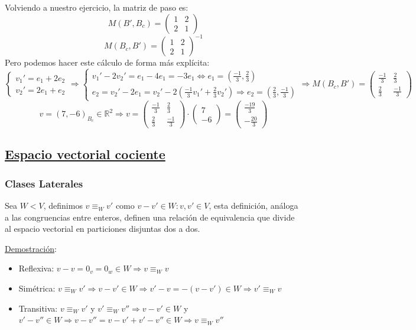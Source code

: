 \documentclass[10pt,a4paper,openright]{book}
\begin{document}
Volviendo a nuestro ejercicio, la matriz de paso es:
$$M(B',B_c)=\left(\begin{array}{cc}1&2\\2&1\end{array}\right)$$
$$M(B_c,B')=\left(\begin{array}{cc}1&2\\2&1\end{array}\right)^{-1}$$
Pero podemos hacer este cálculo de forma más explícita:
$$\begin{cases}
v_1'=e_1+2e_2 \\
v_2'=2e_1+e_2
\end{cases}\Rightarrow
\begin{cases}
v_1'-2v_2'=e_1-4e_1=-3e_1\Leftrightarrow e_1=(\frac{-1}{3}, \frac{2}{3}) \\
e_2=v_2'-2e_1=v_2'-2(\frac{-1}{3}v_1'+\frac{2}{3}v_2')\Rightarrow e_2=(\frac{2}{3},\frac{-1}{3}) 
\end{cases}\Rightarrow
M(B_c,B')=\left(\begin{array}{cc}
\frac{-1}{3} & \frac{2}{3}\\
\frac{2}{3} & \frac{-1}{3}
\end{array}\right)
$$
$$v=(7,-6)_{B_c}\in \mathbb R^2\Rightarrow v=\left(\begin{array}{cc}
\frac{-1}{3} & \frac{2}{3}\\
\frac{2}{3} & \frac{-1}{3}
\end{array}\right)\cdot \left(\begin{array}{c}
7\\
-6
\end{array}\right)=\left(\begin{array}{c}
\frac{-19}{3}\\
-\frac{20}{3}
\end{array}\right)$$

\subsection*{\underline{Espacio vectorial cociente}}
\subsubsection*{Clases Laterales}
Sea $W<V$, definimos $v\equiv_W v'$ como $v-v'\in W: v,v'\in V$, esta definición, análoga a las congruencias entre enteros, definen una relación de equivalencia que divide al espacio vectorial en particiones disjuntas dos a dos.\par
\underline{Demostración}:
\begin{itemize}
\item Reflexiva: $v-v=0_v=0_w\in W\Rightarrow v\equiv_W v$
\item Simétrica: $v\equiv_W v'\Rightarrow v-v'\in W\Rightarrow v'-v=-(v-v')\in W\Rightarrow v'\equiv_W v$
\item Transitiva: $v\equiv_W v'$ y $v'\equiv_W v''\Rightarrow v-v'\in W$ y $v'-v''\in W\Rightarrow v-v''=v-v'+v'-v''\in W\Rightarrow v\equiv_W v''$
\end{itemize}
\end{document}
